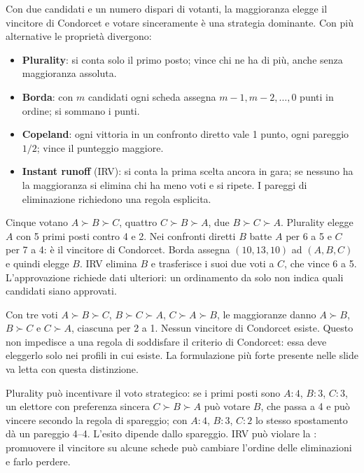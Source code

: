 Con due candidati e un numero dispari di votanti, la maggioranza elegge il vincitore di Condorcet e votare sinceramente è una strategia dominante. Con più alternative le proprietà divergono:
\begin{itemize}
\item \textbf{Plurality}: si conta solo il primo posto; vince chi ne ha di più, anche senza maggioranza assoluta.
\item \textbf{Borda}: con $m$ candidati ogni scheda assegna $m-1,m-2,\dots,0$ punti in ordine; si sommano i punti.
\item \textbf{Copeland}: ogni vittoria in un confronto diretto vale 1 punto, ogni pareggio $1/2$; vince il punteggio maggiore.
\item \textbf{Instant runoff} (IRV): si conta la prima scelta ancora in gara; se nessuno ha la maggioranza si elimina chi ha meno voti e si ripete. I pareggi di eliminazione richiedono una regola esplicita.
\end{itemize}
\begin{esempio}
Cinque votano $A\succ B\succ C$, quattro $C\succ B\succ A$, due $B\succ C\succ A$. Plurality elegge $A$ con 5 primi posti contro 4 e 2. Nei confronti diretti $B$ batte $A$ per 6 a 5 e $C$ per 7 a 4: è il vincitore di Condorcet. Borda assegna $(10,13,10)$ ad $(A,B,C)$ e quindi elegge $B$. IRV elimina $B$ e trasferisce i suoi due voti a $C$, che vince 6 a 5. L'approvazione richiede dati ulteriori: un ordinamento da solo non indica quali candidati siano approvati.
\end{esempio}
\begin{attenzione}
Con tre voti $A\succ B\succ C$, $B\succ C\succ A$, $C\succ A\succ B$, le maggioranze danno $A\succ B$, $B\succ C$ e $C\succ A$, ciascuna per 2 a 1. Nessun vincitore di Condorcet esiste. Questo non impedisce a una regola di soddisfare il criterio di Condorcet: essa deve eleggerlo solo nei profili in cui esiste. La formulazione più forte presente nelle slide va letta con questa distinzione.
\end{attenzione}
Plurality può incentivare il voto strategico: se i primi posti sono $A:4$, $B:3$, $C:3$, un elettore con preferenza sincera $C\succ B\succ A$ può votare $B$, che passa a 4 e può vincere secondo la regola di spareggio; con $A:4$, $B:3$, $C:2$ lo stesso spostamento dà un pareggio 4--4. L'esito dipende dallo spareggio. IRV può violare la : promuovere il vincitore su alcune schede può cambiare l'ordine delle eliminazioni e farlo perdere.

